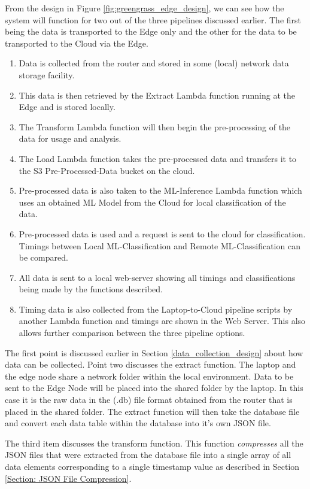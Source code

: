From the design in Figure \ref{fig:greengrass_edge_design}, we can see how the system will function for two out of the three pipelines discussed earlier. The first being the data is transported to the Edge only and the other for the data to be transported to the Cloud via the Edge.
\begin{enumerate}
    \item Data is collected from the router and stored in some (local) network data storage facility.
    \item This data is then retrieved by the Extract Lambda function running at the Edge and is stored locally.
    \item The Transform Lambda function will then begin the pre-processing of the data for usage and analysis.
    \item The Load Lambda function takes the pre-processed data and transfers it to the S3 Pre-Processed-Data bucket on the cloud.
    \item Pre-processed data is also taken to the ML-Inference Lambda function which uses an obtained ML Model from the Cloud for local classification of the data.
    \item Pre-processed data is used and a request is sent to the cloud for classification. Timings between Local ML-Classification and Remote ML-Classification can be compared.
    \item All data is sent to a local web-server showing all timings and classifications being made by the functions described.
    \item Timing data is also collected from the Laptop-to-Cloud pipeline scripts by another Lambda function and timings are shown in the Web Server. This also allows further comparison between the three pipeline options.
\end{enumerate}

The first point is discussed earlier in Section \ref{data_collection_design} about how data can be collected. Point two discusses the extract function. The laptop and the edge node share a network folder within the local environment. Data to be sent to the Edge Node will be placed into the shared folder by the laptop. In this case it is the raw data in the (.db) file format obtained from the router that is placed in the shared folder. The extract function will then take the database file and convert each data table within the database into it's own JSON file.

The third item discusses the transform function. This function \textit{compresses} all the JSON files that were extracted from the database file into a single array of all data elements corresponding to a single timestamp value as described in Section \ref{Section: JSON File Compression}. 

